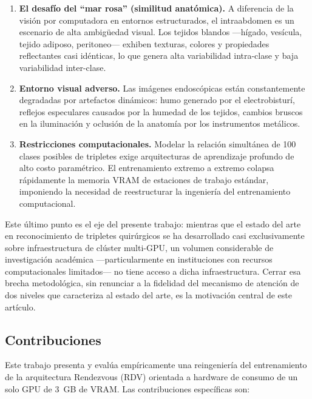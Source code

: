 \documentclass[11pt]{article}
\begin{document}
\begin{enumerate}[label=\arabic*)]
    \item \textbf{El desafío del ``mar rosa'' (similitud anatómica).} A diferencia de la visión por computadora en entornos estructurados, el intraabdomen es un escenario de alta ambigüedad visual. Los tejidos blandos —hígado, vesícula, tejido adiposo, peritoneo— exhiben texturas, colores y propiedades reflectantes casi idénticas, lo que genera alta variabilidad intra-clase y baja variabilidad inter-clase.
    \item \textbf{Entorno visual adverso.} Las imágenes endoscópicas están constantemente degradadas por artefactos dinámicos: humo generado por el electrobisturí, reflejos especulares causados por la humedad de los tejidos, cambios bruscos en la iluminación y oclusión de la anatomía por los instrumentos metálicos.
    \item \textbf{Restricciones computacionales.} Modelar la relación simultánea de 100 clases posibles de tripletes exige arquitecturas de aprendizaje profundo de alto costo paramétrico. El entrenamiento extremo a extremo colapsa rápidamente la memoria VRAM de estaciones de trabajo estándar, imponiendo la necesidad de reestructurar la ingeniería del entrenamiento computacional.
\end{enumerate}

Este último punto es el eje del presente trabajo: mientras que el estado del arte en reconocimiento de tripletes quirúrgicos se ha desarrollado casi exclusivamente sobre infraestructura de clúster multi-GPU, un volumen considerable de investigación académica —particularmente en instituciones con recursos computacionales limitados— no tiene acceso a dicha infraestructura. Cerrar esa brecha metodológica, sin renunciar a la fidelidad del mecanismo de atención de dos niveles que caracteriza al estado del arte, es la motivación central de este artículo.

\subsection{Contribuciones}
\label{sec:contribuciones}

Este trabajo presenta y evalúa empíricamente una reingeniería del entrenamiento de la arquitectura Rendezvous (RDV) orientada a hardware de consumo de un solo GPU de 3~GB de VRAM. Las contribuciones específicas son:
\end{document}
